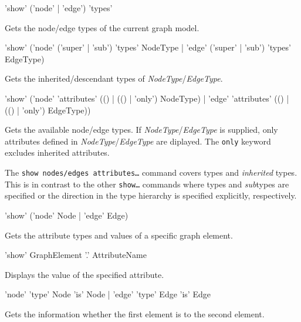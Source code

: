 \begin{rail}
  'show' ('node' | 'edge') 'types'
\end{rail}
Gets the node/edge types of the current graph model.

\begin{rail}
'show' ('node' ('super' | 'sub') 'types' NodeType | 'edge' ('super' | 'sub') 'types' EdgeType)
\end{rail}
Gets the inherited/descendant types of \emph{NodeType}/\emph{EdgeType}.

\begin{rail}
  'show' ('node' 'attributes' (() | (() | 'only') NodeType) | 'edge' 'attributes' (() | (() | 'only') EdgeType))
\end{rail}
Gets the available node/edge  types.
If \emph{NodeType}/\emph{EdgeType} is supplied, only attributes defined in \emph{NodeType}/\emph{EdgeType} are diplayed.
The \texttt{only} keyword excludes inherited attributes.\\
\begin{warning}
The \texttt{show nodes/edges attributes\dots} command covers types and \emph{inherited} types.
This is in contrast to the other \texttt{show\dots} commands where types and \emph{sub}types are specified or the direction in the type hierarchy is specified explicitly, respectively.
\end{warning}

\begin{rail}
 'show' ('node' Node | 'edge' Edge)
\end{rail}
Gets the attribute types and values of a specific graph element.

\begin{rail}
  'show' GraphElement '.' AttributeName
\end{rail}
Displays the value of the specified attribute.

\begin{rail}
  'node' 'type' Node 'is' Node | 'edge' 'type' Edge 'is' Edge
\end{rail}
Gets the information whether the first element is  to the second element.


